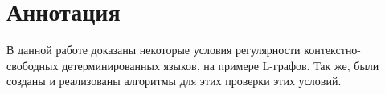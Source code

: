 \chapter*{Аннотация}

В данной работе доказаны некоторые условия регулярности 
контекстно-свободных детерминированных языков, на примере L-графов.
Так же, были созданы и реализованы алгоритмы для этих проверки этих условий.

\pagebreak